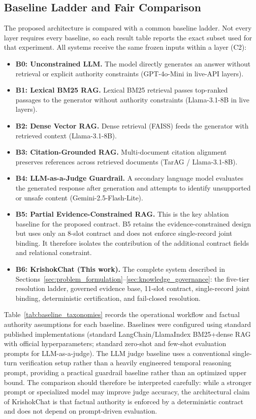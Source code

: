 \documentclass[a4paper,fleqn]{cas-dc}
\begin{document}
\subsection{Baseline Ladder and Fair Comparison}

The proposed architecture is compared with a common baseline ladder. Not every layer requires every baseline, so each result table reports the exact subset used for that experiment. All systems receive the same frozen inputs within a layer (C2):
\begin{itemize}
    \item \textbf{B0: Unconstrained LLM.} The model directly generates an answer without retrieval or explicit authority constraints (GPT-4o-Mini in live-API layers).
    \item \textbf{B1: Lexical BM25 RAG.} Lexical BM25 retrieval passes top-ranked passages to the generator without authority constraints (Llama-3.1-8B in live layers).
    \item \textbf{B2: Dense Vector RAG.} Dense retrieval (FAISS) feeds the generator with retrieved context (Llama-3.1-8B).
    \item \textbf{B3: Citation-Grounded RAG.} Multi-document citation alignment preserves references across retrieved documents (TarAG / Llama-3.1-8B).
    \item \textbf{B4: LLM-as-a-Judge Guardrail.} A secondary language model evaluates the generated response after generation and attempts to identify unsupported or unsafe content (Gemini-2.5-Flash-Lite).
    \item \textbf{B5: Partial Evidence-Constrained RAG.} This is the key ablation baseline for the proposed contract. B5 retains the evidence-constrained design but uses only an 8-slot contract and does not enforce single-record joint binding. It therefore isolates the contribution of the additional contract fields and relational constraint.
    \item \textbf{B6: KrishokChat (This work).} The complete system described in Sections~\ref{sec:problem_formulation}--\ref{sec:knowledge_governance}: the five-tier resolution ladder, governed evidence base, 11-slot contract, single-record joint binding, deterministic certification, and fail-closed resolution.
\end{itemize}

Table~\ref{tab:baseline_taxonomies} records the operational workflow and factual authority assumptions for each baseline. Baselines were configured using standard published implementations (standard LangChain/LlamaIndex BM25+dense RAG with official hyperparameters; standard zero-shot and few-shot evaluation prompts for LLM-as-a-judge). The LLM judge baseline uses a conventional single-turn verification setup rather than a heavily engineered temporal reasoning prompt, providing a practical guardrail baseline rather than an optimized upper bound. The comparison should therefore be interpreted carefully: while a stronger prompt or specialized model may improve judge accuracy, the architectural claim of KrishokChat is that factual authority is enforced by a deterministic contract and does not depend on prompt-driven evaluation.
\end{document}
